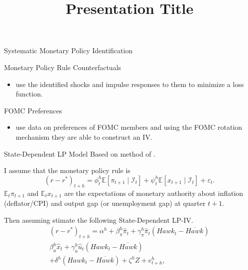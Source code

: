 \documentclass[10pt,aspectratio=169]{beamer}
\title{Presentation Title}
\begin{document}
\begin{frame}
    \titlepage
\end{frame}



\begin{frame}
\end{frame}


\begin{frame}{Systematic Monetary Policy Identification}    
    \begin{block}{Monetary Policy Rule Counterfactuals}
        \begin{itemize}
            \item \cite{McKayWolf2023, BarnichonMesters2023} use the identified shocks and impulse responses to them to minimize a loss function. 
        \end{itemize}
    \end{block}
    \begin{block}{FOMC Preferences}
        \begin{itemize}
            \item  \cite{HIM2023} use \cite{Istrefi2019} data on preferences of FOMC members and using the FOMC rotation mechanism they are able to construct an IV. 
        \end{itemize}
    \end{block}
\end{frame}





\begin{frame}
\end{frame}
    


\begin{frame}{State-Dependent LP Model}
    Based on method of \cite{HIM2023}.

    I assume that the monetary policy rule is 
    \[\left(r-r^*\right)_{t+h}=\phi_t^h\mathbb{E}\left[\pi_{t+1}\mid \mathcal{I}_t\right]+\psi_t^h\mathbb{E}\left[x_{t+1}\mid \mathcal{I}_t\right]+\varepsilon_t.\]
    $\mathbb{E}_t\pi_{t+1}$ and $\mathbb{E}_t x_{t+1}$ are the expectations of monetary authority about inflation (deflator/CPI) and output gap (or unemployment gap) at quarter $t+1$.

    Then assuming stimate the following State-Dependent LP-IV.
    \begin{multline*}
        \left(r-r^*\right)_{t+h}=\alpha^h+\beta_\pi^h \hat\pi_t+\gamma_\pi^h \hat\pi_t\left(\mathit{Hawk}_{t}-\overline{\mathit{Hawk}}\right)\\ \beta_u^h \hat x_t+\gamma_u^h \hat u_t\left(\mathit{Hawk}_{t}-\overline{\mathit{Hawk}}\right)\\ +\delta^h\left(\mathit{Hawk}_{t}-\overline{\mathit{Hawk}}\right)+\zeta^hZ+e_{t+h}^h,
    \end{multline*}
\end{frame}
\end{document}
